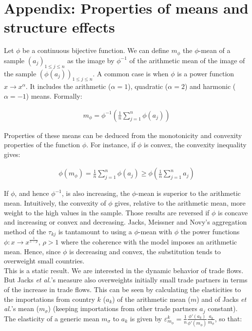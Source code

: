 \documentclass{article}
\begin{document}
\section{\label{A2}Appendix: Properties of means and structure effects}


Let $\phi$ be a continuous bijective function. We can define
$m_{\phi}$ the $\phi$-mean of a sample $(a_j)_{1\leq j\leq n}$
as the image by $\phi^{-1}$ of the arithmetic mean of the image
of the sample $(\phi(a_j))_{1\leq j\leq n}$. A common case is
when $\phi$ is a power function $x \rightarrow x^\alpha$. It
includes the arithmetic ($\alpha=1$), quadratic ($\alpha=2$)
and harmonic ($\alpha=-1$) means. Formally:

\begin{eqnarray*}
m_{\phi}=\phi^{-1}\left(\frac{1}{n}\sum_{j=1}^n \phi(a_j)\right)
\end{eqnarray*}

Properties of these means can be deduced from the monotonicity
and convexity properties of the function $\phi$. For instance,
if $\phi$ is convex, the convexity inequality gives:

\begin{eqnarray*}
\phi(m_{\phi})=\frac{1}{n}\sum_{j=1}^n\phi(a_j)\geq \phi\left(\frac{1}{n}\sum_{j=1}^n
a_j\right)
\end{eqnarray*}

If $\phi$, and hence $\phi^{-1}$, is also increasing, the
$\phi$-mean is superior to the arithmetic mean. Intuitively,
the convexity of $\phi$ gives, relative to the arithmetic mean,
more weight to the high values in the sample. Those results are
reversed if $\phi$ is concave and increasing or convex and
decreasing. Jacks, Meissner and Novy's aggregation method of
the $\tau_{kj}$ is tantamount to using a $\phi$-mean with
$\phi$ the power functions $\phi: x \rightarrow
x^{\frac{1}{1-\rho}}$, $\rho>1$ where the coherence with the
model imposes an arithmetic mean. Hence, since $\phi$ is
decreasing and convex, the substitution tends to overweight
small countries.\\

This is a static result. We are interested in the dynamic
behavior of trade flows. But Jacks \textit{et al.}'s measure also
overweights initially small trade partners in terms of the
increase in trade flows. This can be seen by calculating the
elasticities to the importations from country $k$ ($a_k$) of
the arithmetic mean ($m$) and of Jacks \textit{et al.}'s mean
($m_{\sigma}$) (keeping importations from other trade partners
$a_j$ constant). The elasticity of a generic mean $m_\sigma$ to
$a_k$ is given by
\mbox{$\varepsilon_{m_{\phi}}^k=\frac{1}{n}\frac{\phi'(a_k)}{\phi'(m_{\phi})}\frac{a_k}{m_{\phi}}$},
so that:
\end{document}
